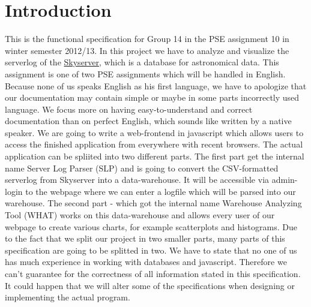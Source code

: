 \section{Introduction}
This is the functional specification for Group 14 in the PSE assignment 10 in winter semester 2012/13. 
In this project we have to analyze and visualize the serverlog of the 
\href{http://skyserver.sdss.org/public/en/}{Skyserver}, 
which is a database for astronomical data. This assignment is one of two PSE assignments which will be handled in English.
Because none of us speaks English as his first language, we have to apologize that our documentation may contain simple 
or maybe in some parts incorrectly used language. We focus more on having easy-to-understand and correct documentation 
than on perfect English, which sounds like written by a native speaker.
\newline\newline
We are going to write a web-frontend in javascript which allows users to access the finished application from everywhere
with recent browsers. The actual application can be spliited into two different parts. The first part get the internal name
Server Log Parser (SLP) and is going to convert the CSV-formatted serverlog from Skyserver into a data-warehouse. It will
be accessible via admin-login to the webpage where we can enter a logfile which will be parsed into our warehouse.
The second part - which got the internal name Warehouse Analyzing Tool (WHAT) works on this data-warehouse 
and allows every user of our webpage to create various charts, for example scatterplots and histograms.
Due to the fact that we split our project in two smaller parts, many parts of this specification 
are going to be splitted in two.
\newline
\newline
We have to state that no one of us has much experience in working with databases and javascript.
Therefore we can't guarantee for the correctness of all information stated in this specification.
It could happen that we will alter some of the specifications when designing or 
implementing the actual program.

